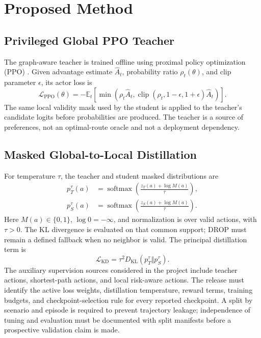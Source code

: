 \documentclass{ieeeaccess}
\newcommand{\E}{\mathbb{E}}
\newcommand{\AuthorCheck}[1]{\textcolor{ReviewBlue}{#1}}
\begin{document}
\section{Proposed Method}

\subsection{Privileged Global PPO Teacher}

The graph-aware teacher is trained offline using proximal policy optimization (PPO) \cite{schulman2017ppo}. Given advantage estimate $\hat A_t$, probability ratio $\rho_t(\theta)$, and clip parameter $\epsilon$, its actor loss is
\begin{equation}
\mathcal{L}_{\mathrm{PPO}}(\theta)=-\E_t\!\left[\min\left(\rho_t\hat A_t,\operatorname{clip}(\rho_t,1-\epsilon,1+\epsilon)\hat A_t\right)\right].
\end{equation}
The same local validity mask used by the student is applied to the teacher's candidate logits before probabilities are produced. The teacher is a source of preferences, not an optimal-route oracle and not a deployment dependency.

\subsection{Masked Global-to-Local Distillation}

For temperature $\tau$, the teacher and student masked distributions are
\begin{equation}
\begin{aligned}
p_T^\tau(a)&=\operatorname{softmax}\!\left(\frac{z_T(a)+\log M(a)}{\tau}\right),\\
p_S^\tau(a)&=\operatorname{softmax}\!\left(\frac{z_S(a)+\log M(a)}{\tau}\right).
\end{aligned}
\end{equation}
Here $M(a)\in\{0,1\}$, $\log 0=-\infty$, and normalization is over valid actions, with $\tau>0$. The KL divergence is evaluated on that common support; DROP must remain a defined fallback when no neighbor is valid. The principal distillation term is \cite{hinton2015distilling}
\begin{equation}
\mathcal{L}_{\mathrm{KD}}=\tau^2D_{\mathrm{KL}}(p_T^\tau\Vert p_S^\tau).
\end{equation}
The auxiliary supervision sources considered in the project include teacher actions, shortest-path actions, and local risk-aware actions. \AuthorCheck{The release must identify the active loss weights, distillation temperature, reward terms, training budgets, and checkpoint-selection rule for every reported checkpoint.} A split by scenario and episode is required to prevent trajectory leakage; independence of tuning and evaluation must be documented with split manifests before a prospective validation claim is made.
\end{document}
